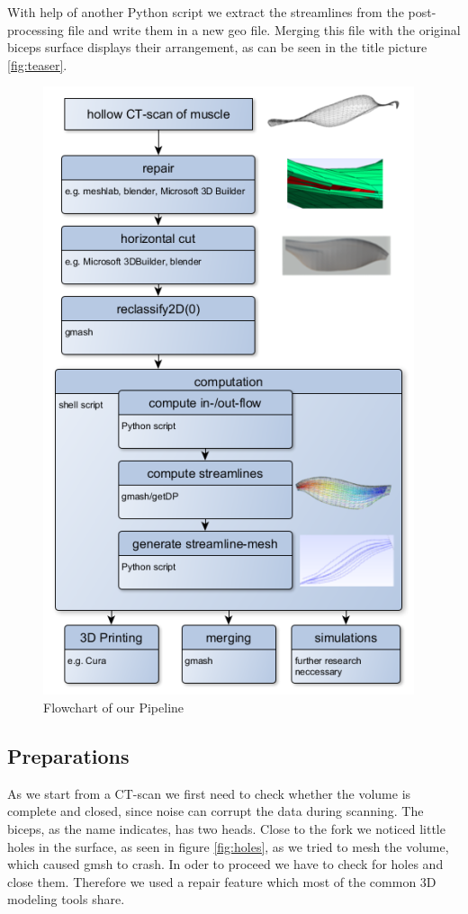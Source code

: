 \documentclass[preprint,journal]{vgtc}       %
\begin{document}
With help of another Python script we extract the streamlines from the post-processing file and write them in a new geo file. 
Merging this file with the original biceps surface displays their arrangement, as can be seen in the title picture \ref{fig:teaser}.
\begin{figure}
	\begin{center}
		\includegraphics[width=.7\linewidth]{flow.png}
	\end{center}
	\caption{Flowchart of our Pipeline}
	\label{fig:flow}
	
\end{figure}
\subsection{Preparations}
As we start from a CT-scan we first need to check whether the volume is complete and closed, since noise can corrupt the data during scanning.
The biceps, as the name indicates, has two heads. 
Close to the fork we noticed little holes in the surface, as seen  in figure \ref{fig:holes}, as we tried to mesh the volume, which caused gmsh to crash. 
In oder to proceed we have to check for holes and close them.
Therefore we used a repair feature which most of the common 3D modeling tools share. 
\end{document}
